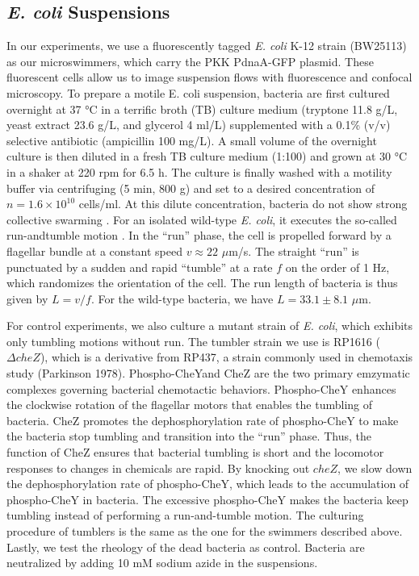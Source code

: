 \subsection{\textit{E. coli} Suspensions}
In our experiments, we use a fluorescently tagged \textit{E. coli} K-12 strain (BW25113) as our microswimmers, which carry the
PKK PdnaA-GFP plasmid. These fluorescent cells allow us to image suspension flows with fluorescence and confocal microscopy. To prepare a motile E. coli suspension, bacteria are first cultured overnight at 37 °C in a terrific broth (TB) culture medium (tryptone 11.8 g/L, yeast extract 23.6 g/L, and glycerol 4 ml/L) supplemented with a 0.1\% (v/v) selective antibiotic (ampicillin 100 mg/L). A small volume of the overnight culture is then diluted in a fresh TB culture medium (1:100) and grown at 30 °C in a shaker at 220 rpm for 6.5 h. The culture is finally washed with a motility buffer via centrifuging (5 min, 800 g) and set to a desired concentration of $n = 1.6 \times 10^{10}$ cells/ml. At this dilute concentration, bacteria do not show strong collective swarming \cite{Guo2018}. For an isolated wild-type \textit{E. coli}, it executes the so-called run-andtumble motion \cite{Berg2004}. In the ``run'' phase, the cell is propelled forward by a flagellar bundle at a constant speed $v \approx 22$ $\mu$m/s. The straight ``run'' is punctuated by a sudden and rapid ``tumble'' at a rate $f$ on the order of 1 Hz, which randomizes the orientation of the cell. The run length of bacteria
is thus given by $L = v/f$. For the wild-type bacteria, we have $L = 33.1 \pm 8.1$ $\mu$m.

For control experiments, we also culture a mutant strain of \textit{E. coli}, which exhibits only tumbling motions without run. The tumbler strain we use is RP1616 ($\Delta cheZ$), which is a derivative from RP437, a strain commonly used in chemotaxis study \cite{Parkinson1978} (Parkinson 1978). Phospho-CheYand CheZ are the two primary emzymatic complexes governing bacterial chemotactic behaviors. Phospho-CheY enhances the clockwise rotation of the flagellar motors that enables the tumbling of bacteria. CheZ promotes the dephosphorylation rate of phospho-CheY to make the bacteria stop tumbling and transition into the ``run'' phase. Thus, the function of CheZ ensures that bacterial tumbling is short and the locomotor responses to changes in chemicals are rapid. By knocking out $cheZ$, we slow down the dephosphorylation rate of phospho-CheY, which leads to the accumulation of phospho-CheY in bacteria. The excessive phospho-CheY makes the bacteria keep tumbling instead of performing a run-and-tumble motion. The culturing procedure of tumblers is the same as the one for the swimmers described above. Lastly, we test the rheology of the dead bacteria as control. Bacteria are neutralized by adding 10 mM sodium azide in the suspensions.

